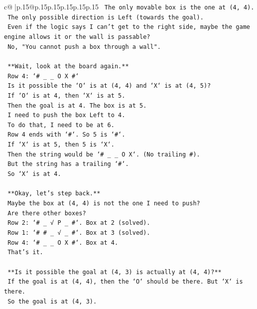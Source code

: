 \documentclass{article}
\begin{document}
{\begin{supertabular}{c@{$\;$}|p{.15\linewidth}@{}p{.15\linewidth}p{.15\linewidth}p{.15\linewidth}p{.15\linewidth}p{.15\linewidth}}
{{{\texttt{    The only movable box is the one at (4, 4).} \\
\texttt{    The only possible direction is Left (towards the goal).} \\
\texttt{    Even if the logic says I can't get to the right side, maybe the game engine allows it or the wall is passable?} \\
\texttt{    No, "You cannot push a box through a wall".} \\
\\ 
\texttt{    **Wait, look at the board again.**} \\
\texttt{    Row 4: `\# \_ \_ O X \#`} \\
\texttt{    Is it possible the `O` is at (4, 4) and `X` is at (4, 5)?} \\
\texttt{    If `O` is at 4, then `X` is at 5.} \\
\texttt{    Then the goal is at 4. The box is at 5.} \\
\texttt{    I need to push the box Left to 4.} \\
\texttt{    To do that, I need to be at 6.} \\
\texttt{    Row 4 ends with `\#`. So 5 is `\#`.} \\
\texttt{    If `X` is at 5, then 5 is `X`.} \\
\texttt{    Then the string would be `\# \_ \_ O X`. (No trailing \#).} \\
\texttt{    But the string has a trailing `\#`.} \\
\texttt{    So `X` is at 4.} \\
\\ 
\texttt{    **Okay, let's step back.**} \\
\texttt{    Maybe the box at (4, 4) is not the one I need to push?} \\
\texttt{    Are there other boxes?} \\
\texttt{    Row 2: `\# \_ √ P \_ \#`. Box at 2 (solved).} \\
\texttt{    Row 1: `\# \# \_ √ \_ \#`. Box at 3 (solved).} \\
\texttt{    Row 4: `\# \_ \_ O X \#`. Box at 4.} \\
\texttt{    That's it.} \\
\\ 
\texttt{    **Is it possible the goal at (4, 3) is actually at (4, 4)?**} \\
\texttt{    If the goal is at (4, 4), then the `O` should be there. But `X` is there.} \\
\texttt{    So the goal is at (4, 3).} \\
}}}
\end{supertabular}}
\end{document}
